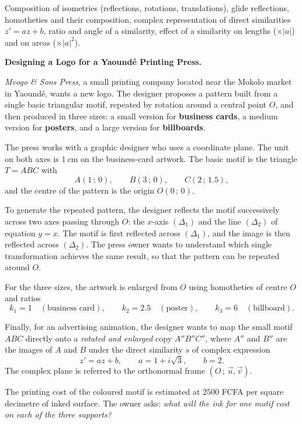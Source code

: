\documentclass[11pt]{article}
\newcounter{popsec}
\newcounter{popsub}
\newcommand{\courssub}[1]{%
  \stepcounter{popsub}%
  \par\vspace{9pt}\noindent{\popxbold\fontsize{11.5}{13}\selectfont\color{popink}{\color{poporange}\thepopsec.\thepopsub}\hspace{6pt}#1}\par\nopagebreak\vspace{4pt}
}
\begin{document}
\begin{aretenir}
Composition of isometries (reflections, rotations, translations), glide reflections, homotheties and their composition, complex representation of direct similarities $z' = az + b$, ratio and angle of a similarity, effect of a similarity on lengths ($\times |a|$) and on areas ($\times |a|^{2}$).
\end{aretenir}

\courssub{Situation}

\textbf{Designing a Logo for a Yaoundé Printing Press.}\par
\medskip
\emph{Mvogo \& Sons Press}, a small printing company located near the Mokolo market in Yaoundé, wants a new logo. The designer proposes a pattern built from a single basic triangular motif, repeated by rotation around a central point $O$, and then produced in three sizes: a small version for \textbf{business cards}, a medium version for \textbf{posters}, and a large version for \textbf{billboards}.

The press works with a graphic designer who uses a coordinate plane. The unit on both axes is $1\ \mathrm{cm}$ on the business-card artwork. The basic motif is the triangle $T = ABC$ with
\[ A(1\,;\,0), \qquad B(3\,;\,0), \qquad C(2\,;\,1.5), \]
and the centre of the pattern is the origin $O(0\,;\,0)$.

To generate the repeated pattern, the designer reflects the motif successively across two axes passing through $O$: the $x$-axis $(\Delta_1)$ and the line $(\Delta_2)$ of equation $y = x$. The motif is first reflected across $(\Delta_1)$, and the image is then reflected across $(\Delta_2)$. The press owner wants to understand which single transformation achieves the same result, so that the pattern can be repeated around $O$.

For the three sizes, the artwork is enlarged from $O$ using homotheties of centre $O$ and ratios
\[ k_1 = 1 \quad (\text{business card}), \qquad k_2 = 2.5 \quad (\text{poster}), \qquad k_3 = 6 \quad (\text{billboard}). \]

Finally, for an advertising animation, the designer wants to map the small motif $ABC$ directly onto a \emph{rotated and enlarged} copy $A''B''C''$, where $A''$ and $B''$ are the images of $A$ and $B$ under the direct similarity $s$ of complex expression
\[ z' = az + b, \qquad a = 1 + i\sqrt{3}, \qquad b = 2. \]
The complex plane is referred to the orthonormal frame $(O\,;\,\vec{u},\vec{v})$.

The printing cost of the coloured motif is estimated at $2500$ FCFA per square decimetre of inked surface. The owner asks: \emph{what will the ink for one motif cost on each of the three supports?}
\end{document}
